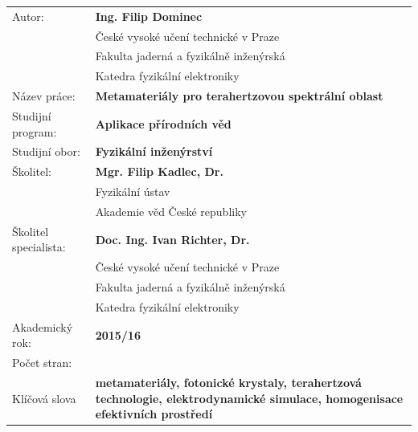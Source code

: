 \bgroup {}
\noindent\begin{tabular}{p{.30\linewidth}p{.65\linewidth}}
	Autor:				&\textbf{Ing. Filip Dominec} \\ 
					~	&České vysoké učení technické v Praze\\ 
					~	&Fakulta jaderná a fyzikálně inženýrská\\  
					~	&Katedra fyzikální elektroniky\\
Název práce:			&\textbf{Metamateriály pro terahertzovou spektrální oblast} \\
Studijní program:		&\textbf{Aplikace přírodních věd} \\
Studijní obor:			&\textbf{Fyzikální inženýrství} \\
Školitel:				&\textbf{Mgr. Filip Kadlec, Dr.} \\
					~	&Fyzikální ústav\\ 
					~	&Akademie věd České republiky\\  %
Školitel specialista:	&\textbf{Doc. Ing. Ivan Richter, Dr.} \\
					~	&České vysoké učení technické v Praze\\ 
					~	&Fakulta jaderná a fyzikálně inženýrská\\  
					~	&Katedra fyzikální elektroniky\\
Akademický rok:			&\textbf{2015/16} \\			%
Počet stran:			&\textbf{\pageref{enddocument}} \\  %
Klíčová slova			&\textbf{metamateriály, fotonické krystaly, terahertzová technologie, elektrodynamické simulace, homogenisace efektivních prostředí} \\
\end{tabular}
\egroup

\thispagestyle{empty} \newpage ~ \thispagestyle{empty} \newpage \setcounter{page}{1}

